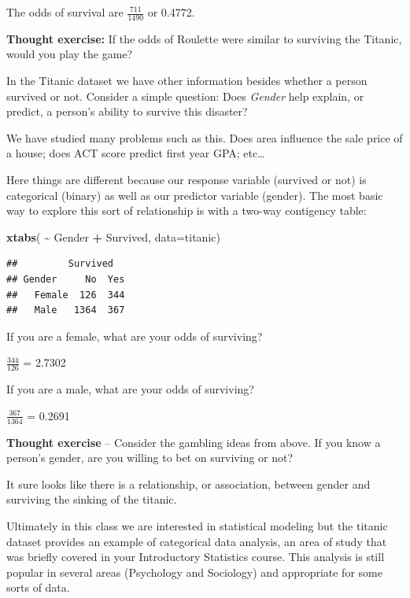\documentclass[
]{book}
\newenvironment{Shaded}{\begin{snugshade}}{\end{snugshade}}
\newcommand{\AttributeTok}[1]{\textcolor[rgb]{0.13,0.29,0.53}{#1}}
\newcommand{\FunctionTok}[1]{\textcolor[rgb]{0.13,0.29,0.53}{\textbf{#1}}}
\newcommand{\NormalTok}[1]{#1}
\newcommand{\SpecialCharTok}[1]{\textcolor[rgb]{0.81,0.36,0.00}{\textbf{#1}}}
\begin{document}
The odds of survival are \(\frac{711}{1490}\) or 0.4772.

\textbf{Thought exercise:} If the odds of Roulette were similar to surviving the Titanic, would you play the game?

In the Titanic dataset we have other information besides whether a person survived or not. Consider a simple question: Does \emph{Gender} help explain, or predict, a person's ability to survive this disaster?

We have studied many problems such as this. Does area influence the sale price of a house; does ACT score predict first year GPA; etc\ldots{}

Here things are different because our response variable (survived or not) is categorical (binary) as well as our predictor variable (gender). The most basic way to explore this sort of relationship is with a two-way contigency table:

\begin{Shaded}
\begin{Highlighting}[]
\FunctionTok{xtabs}\NormalTok{( }\SpecialCharTok{\textasciitilde{}}\NormalTok{ Gender }\SpecialCharTok{+}\NormalTok{ Survived, }\AttributeTok{data=}\NormalTok{titanic)}
\end{Highlighting}
\end{Shaded}

\begin{verbatim}
##         Survived
## Gender     No  Yes
##   Female  126  344
##   Male   1364  367
\end{verbatim}

If you are a female, what are your odds of surviving?

\(\frac{344}{126}\) = 2.7302

If you are a male, what are your odds of surviving?

\(\frac{367}{1364}\) = 0.2691

\textbf{Thought exercise} -- Consider the gambling ideas from above. If you know a person's gender, are you willing to bet on surviving or not?

It sure looks like there is a relationship, or association, between gender and surviving the sinking of the titanic.

Ultimately in this class we are interested in statistical modeling but the titanic dataset provides an example of categorical data analysis, an area of study that was briefly covered in your Introductory Statistics course. This analysis is still popular in several areas (Psychology and Sociology) and appropriate for some sorts of data.
\end{document}
